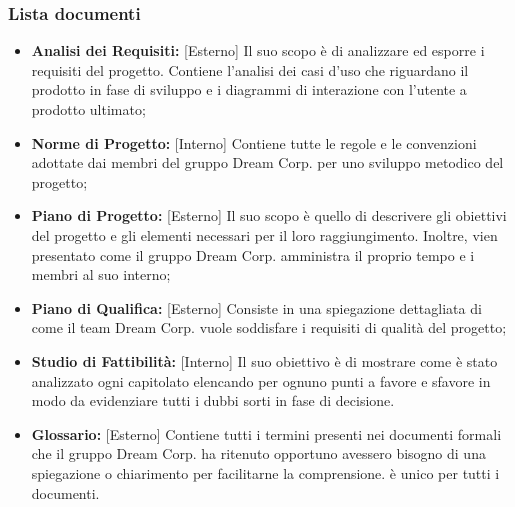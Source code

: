		\subsubsection{Lista documenti}
		\label{3.1.5}
			\begin{itemize}
				\item \textbf{Analisi dei Requisiti: }[Esterno] \newline
				Il suo scopo è di analizzare ed esporre i requisiti del progetto. Contiene l'analisi dei casi d'uso che riguardano il prodotto in fase di sviluppo e i diagrammi di interazione con l'utente a prodotto ultimato;
				\item \textbf{Norme di Progetto: }[Interno] \newline
				Contiene tutte le regole e le convenzioni adottate dai membri del gruppo Dream Corp. per uno sviluppo metodico del progetto;
				\item \textbf{Piano di Progetto: }[Esterno] \newline
				Il suo scopo è quello di descrivere gli obiettivi del progetto e gli elementi necessari per il loro raggiungimento. Inoltre, vien presentato come il gruppo Dream Corp. amministra il proprio tempo e i membri al suo interno;
				\item \textbf{Piano di Qualifica: }[Esterno] \newline
				Consiste in una spiegazione dettagliata di come il team Dream Corp. vuole soddisfare i requisiti di qualità del progetto;
				\item \textbf{Studio di Fattibilità: }[Interno] \newline
				Il suo obiettivo è di mostrare come è stato analizzato ogni capitolato elencando per ognuno punti a favore e sfavore in modo da evidenziare tutti i dubbi sorti in fase di decisione.
				\item \textbf{Glossario: }[Esterno] \newline
				Contiene tutti i termini presenti nei documenti formali che il gruppo Dream Corp. ha ritenuto opportuno avessero bisogno di una spiegazione o chiarimento per facilitarne la comprensione. è unico per tutti i documenti.
			\end{itemize}
